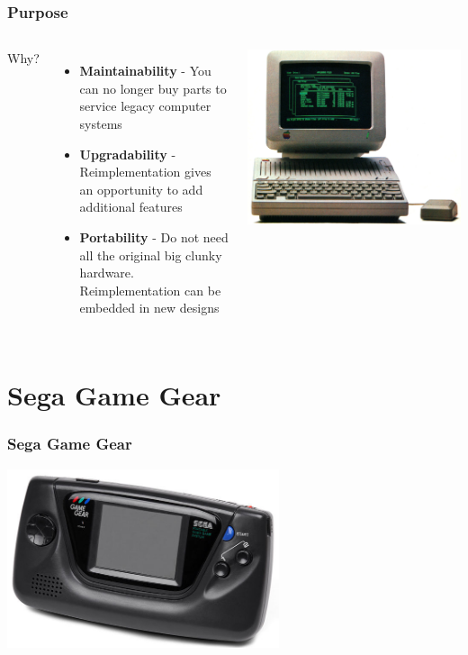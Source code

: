 \documentclass{beamer}
\newlength{\wideitemsep}
\let\olditem\item
\renewcommand{\item}{\setlength{\itemsep}{\wideitemsep}\olditem}
\begin{document}
\begin{frame}
    \frametitle{Purpose}

    \begin{columns}[c]
            Why?
            \begin{itemize}
                \item<2-> \textbf{Maintainability} - You can no longer buy parts to service legacy computer systems
                \item<3-> \textbf{Upgradability} - Reimplementation gives an opportunity to add additional features
                \item<4-> \textbf{Portability} - Do not need all the original big clunky hardware. Reimplementation can
                    be embedded in new designs
            \end{itemize}

            \includegraphics[width=\textwidth]{../images/apple_2.jpg}
    \end{columns}
\end{frame}

\section{Sega Game Gear}
\begin{frame}
    \frametitle{Sega Game Gear}
    \begin{center}
        \includegraphics[width=0.6\textwidth]{../images/gg.jpg}
    \end{center}
\end{frame}
\end{document}
